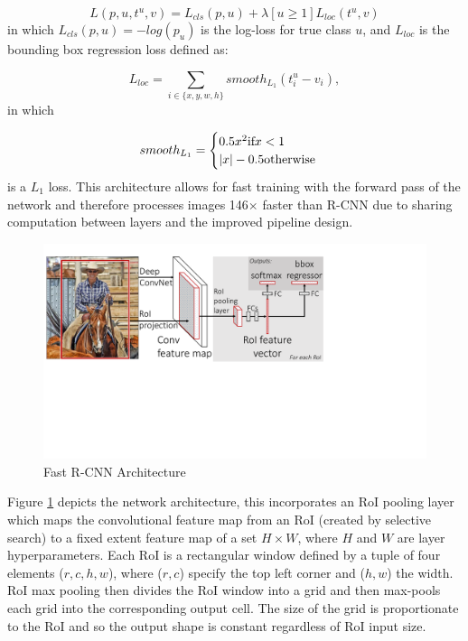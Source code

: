 \documentclass[a4paper,11pt,notitlepage]{article}
\begin{document}
\begin{equation}
\label{multi-task_loss}
L(p,u,t^{u},v) = L_{cls}(p,u) + \lambda[u \geq 1]L_{loc}(t^{u},v)
\end{equation}
in which $L_{cls}(p,u) = -log(p_{u})$ is the log-loss for true class $u$, and $L_{loc}$ is the bounding box regression loss defined as:

\begin{equation}
\label{bbox_loss}
L_{loc} = \sum_{i\in \{x,y,w,h\}}smooth_{L_{1}}(t^{u}_{i}-v_{i}),
\end{equation}
in which

\begin{equation}
\label{multi-task_s}
smooth_{L_{1}} = 
\begin{cases}
0.5x^{2} \textnormal{if} x < 1 \\
|x| - 0.5  \textnormal{otherwise} \\
\end{cases}
\end{equation}
is a $L_{1}$ loss. This architecture allows for fast training with the forward pass of the network and therefore processes images 146$\times$ faster than R-CNN due to sharing computation between layers and the improved pipeline design. 

\noindent \begin{figure}[h!]
\includegraphics[trim={0 22em 22em 3em},clip,width = 1.0\hsize]{./figures/arch.pdf}
\caption{Fast R-CNN Architecture \cite{DBLP:journals/corr/Girshick15}}
\label{Fast_RNN_fig}
\end{figure}

Figure \ref{Fast_RNN_fig} depicts the network architecture, this incorporates an RoI pooling layer which maps the convolutional feature map from an RoI (created by selective search) to a fixed extent feature map of a set $H \times W$, where $H$ and $W$ are layer hyperparameters. Each RoI is a rectangular window defined by a tuple of four elements ($r,c,h,w$), where ($r,c$) specify the top left corner and ($h,w$) the width. RoI max pooling then divides the RoI window into a grid and then max-pools each grid into the corresponding output cell. The size of the grid is proportionate to the RoI and so the output shape is constant regardless of RoI input size. 
\end{document}
